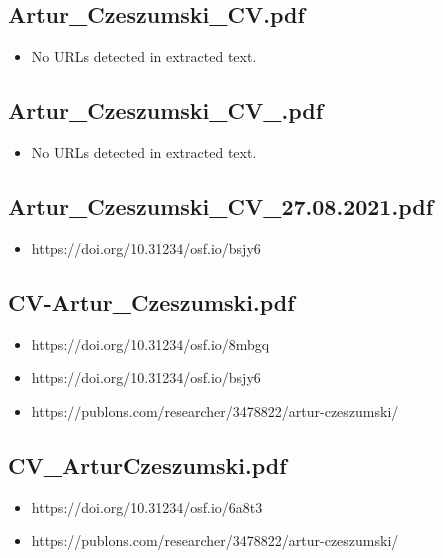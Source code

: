 \documentclass[
  oneside]{article}
\author{}
\date{}
\providecommand{\tightlist}{%
  \setlength{\itemsep}{0pt}\setlength{\parskip}{0pt}}
\begin{document}
\subsection{Artur\_Czeszumski\_CV.pdf}\label{artur_czeszumski_cv.pdf}

\begin{itemize}
\tightlist
\item
  No URLs detected in extracted text.
\end{itemize}

\subsection{Artur\_Czeszumski\_CV\_.pdf}\label{artur_czeszumski_cv_.pdf}

\begin{itemize}
\tightlist
\item
  No URLs detected in extracted text.
\end{itemize}

\subsection{Artur\_Czeszumski\_CV\_27.08.2021.pdf}\label{artur_czeszumski_cv_27.08.2021.pdf}

\begin{itemize}
\tightlist
\item
  https://doi.org/10.31234/osf.io/bsjy6
\end{itemize}

\subsection{CV-Artur\_Czeszumski.pdf}\label{cv-artur_czeszumski.pdf}

\begin{itemize}
\tightlist
\item
  https://doi.org/10.31234/osf.io/8mbgq
\item
  https://doi.org/10.31234/osf.io/bsjy6
\item
  https://publons.com/researcher/3478822/artur-czeszumski/
\end{itemize}

\subsection{CV\_ArturCzeszumski.pdf}\label{cv_arturczeszumski.pdf}

\begin{itemize}
\tightlist
\item
  https://doi.org/10.31234/osf.io/6a8t3
\item
  https://publons.com/researcher/3478822/artur-czeszumski/
\end{itemize}
\end{document}
